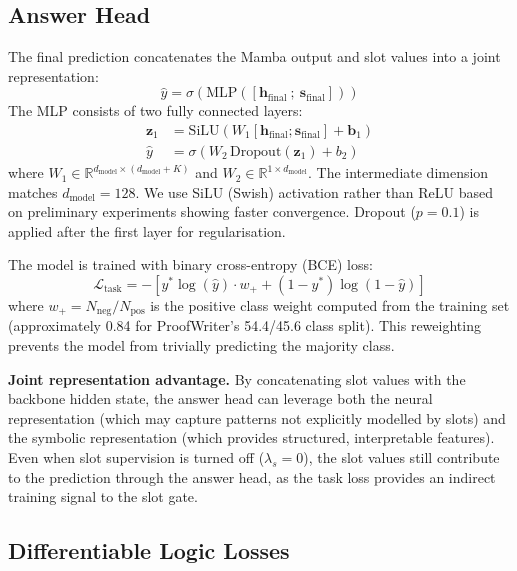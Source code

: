 \documentclass[conference]{IEEEtran}
\newcommand{\Real}{\mathbb{R}}
\begin{document}
\subsection{Answer Head}
\label{sec:answer}

The final prediction concatenates the Mamba output and slot values
into a joint representation:
\begin{equation}
    \hat{y} = \sigma\!\left(\mathrm{MLP}\!\left(
    [\mathbf{h}_\text{final}\ ;\ \mathbf{s}_\text{final}]
    \right)\right)
\end{equation}
The MLP consists of two fully connected layers:
\begin{align}
    \mathbf{z}_1 &= \mathrm{SiLU}\!\left(W_1 [\mathbf{h}_{\text{final}}; \mathbf{s}_{\text{final}}] + \mathbf{b}_1\right) \\
    \hat{y} &= \sigma\!\left(W_2\, \mathrm{Dropout}(\mathbf{z}_1) + b_2\right)
\end{align}
where $W_1 \in \Real^{d_{\text{model}} \times (d_{\text{model}} + K)}$
and $W_2 \in \Real^{1 \times d_{\text{model}}}$.  The intermediate
dimension matches $d_{\text{model}} = 128$.  We use SiLU
(Swish) activation rather than ReLU based on preliminary
experiments showing faster convergence.  Dropout ($p=0.1$) is
applied after the first layer for regularisation.

The model is trained with binary cross-entropy (BCE) loss:
\begin{equation}
    \mathcal{L}_{\text{task}} = -\left[y^* \log(\hat{y}) \cdot w_+ + (1 - y^*) \log(1 - \hat{y})\right]
\end{equation}
where $w_+ = N_{\text{neg}} / N_{\text{pos}}$ is the positive
class weight computed from the training set (approximately 0.84
for ProofWriter's 54.4/45.6 class split).  This reweighting
prevents the model from trivially predicting the majority class.

\textbf{Joint representation advantage.}
By concatenating slot values with the backbone hidden state, the
answer head can leverage both the neural representation (which
may capture patterns not explicitly modelled by slots) and the
symbolic representation (which provides structured, interpretable
features).  Even when slot supervision is turned off
($\lambda_s = 0$), the slot values still contribute to the
prediction through the answer head, as the task loss provides
an indirect training signal to the slot gate.

\subsection{Differentiable Logic Losses}
\label{sec:logicloss}
\end{document}

